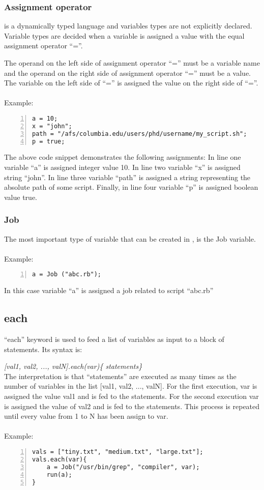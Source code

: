 \subsubsection*{Assignment operator}
\lang{}  is a dynamically typed language and variables types are not explicitly declared.
Variable types are decided when a variable is assigned a value with the equal
assignment operator ``=''.

The operand on the left side of assignment operator ``='' must be a variable name
and the operand on the right side of assignment operator ``='' must be a value.
The variable on the left side of ``='' is assigned the value on the right side
of ``=''.\\
\\
Example:
\begin{Verbatim}[numbers=left]
a = 10;
x = "john";
path = "/afs/columbia.edu/users/phd/username/my_script.sh";
p = true;
\end{Verbatim}

The above code snippet demonstrates the following assignments:
In line one variable ``a'' is assigned integer value 10.
In line two variable ``x'' is assigned string ``john''.
In line three variable ``path'' is assigned a string representing the absolute
path of some script.
Finally, in line four variable ``p'' is assigned boolean value true.

\subsubsection*{Job}
The most important type of variable that can be created in \lang{}, is the
Job variable.\\
\\
Example:
\begin{Verbatim}[numbers=left]
a = Job ("abc.rb");
\end{Verbatim}
In this case variable ``a'' is assigned a job related to script ``abc.rb'' 

\subsection*{each}

\noindent ``each'' keyword is used to feed a list of variables as input
to a block of statements. Its syntax is:

\textit{[val1, val2, ..., valN].each(var)\{ statements\}}\\

The interpretation is that ``statements'' are executed as many times as the
number of variables in the list [val1, val2, ..., valN]. For the first
execution, var is assigned
the value val1 and is fed to the statements. For the second execution var is
assigned the value
of val2 and is fed to the statements. This process is repeated until every value 
from 1 to N has been assign to var.\\
\\
Example:
\begin{Verbatim}[numbers=left]
vals = ["tiny.txt", "medium.txt", "large.txt"];
vals.each(var){
    a = Job("/usr/bin/grep", "compiler", var);
    run(a);
}
\end{Verbatim}


